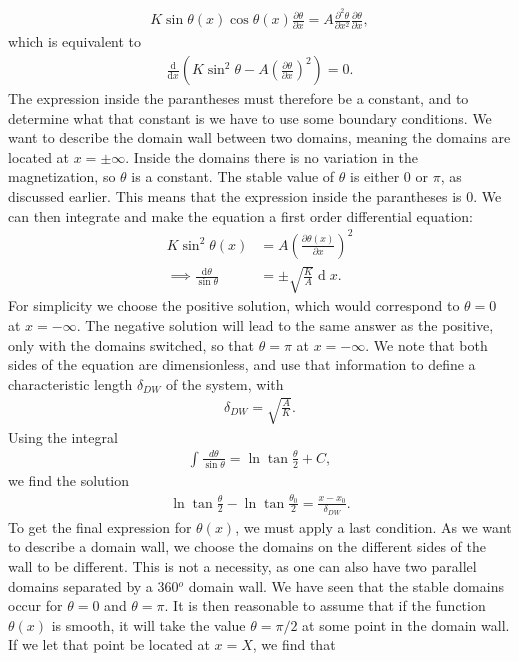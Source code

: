 \documentclass[12pt, a4paper]{article}		%
\renewcommand{\d}[1]{\ensuremath{\operatorname{d}\!{#1}}}
\numberwithin{equation}{section}
\begin{document}
\begin{align}
\label{eq:theta_doublediff}
K\sin \theta (x) \cos \theta (x) \frac{\partial \theta}{\partial x} = A \frac{\partial^2 \theta}{\partial x^2}\frac{\partial \theta}{\partial x},
\end{align}
which is equivalent to
\begin{align}
\frac{\textrm{d}}{\textrm{d} x} (K \sin ^2 \theta - A (\frac{\partial \theta}{\partial x})^2) = 0.
\end{align}
The expression inside the parantheses must therefore be a constant, and to determine what that constant is we have to use some boundary conditions. We want to describe the domain wall between two domains, meaning the domains are located at $x = \pm \infty$. Inside the domains there is no variation in the magnetization, so $\theta$ is a constant. The stable value of $\theta$ is either 0 or $\pi$, as discussed earlier. This means that the expression inside the parantheses is 0. We can then integrate and make the equation a first order differential equation:
\begin{align*}
K \sin ^2 \theta(x) &= A (\frac{\partial \theta(x)}{\partial x})^2 \\
\implies \frac{\textrm{d} \theta}{\sin \theta} &= \pm \sqrt{\frac{K}{A}} \d x.
\end{align*}
For simplicity we choose the positive solution, which would correspond to $\theta = 0$ at $x = -\infty$. The negative solution will lead to the same answer as the positive, only with the domains switched, so that $\theta = \pi$ at $x = -\infty$. We note that both sides of the equation are dimensionless, and use that information to define a characteristic length $\delta_{DW}$ of the system, with
\begin{align}
\delta_{DW} = \sqrt{\frac{A}{K}}.
\end{align}
Using the integral
\begin{align}
\int \frac{d\theta}{\sin\theta} = \ln \tan\frac{\theta}{2} + C,
\end{align}
we find the solution
\begin{align}
\ln \tan\frac{\theta}{2} - \ln \tan\frac{\theta_0}{2} = \frac{x-x_0}{\delta_{DW}}.
\end{align}
To get the final expression for $\theta(x)$, we must apply a last condition. As we want to describe a domain wall, we choose the domains on the different sides of the wall to be different. This is not a necessity, as one can also have two parallel domains separated by a 360$^o$ domain wall. We have seen that the stable domains occur for $\theta = 0$ and $\theta = \pi$. It is then reasonable to assume that if the function $\theta (x)$ is smooth, it will take the value $\theta = \pi/2$ at some point in the domain wall. If we let that point be located at $x = X$, we find that
\end{document}
